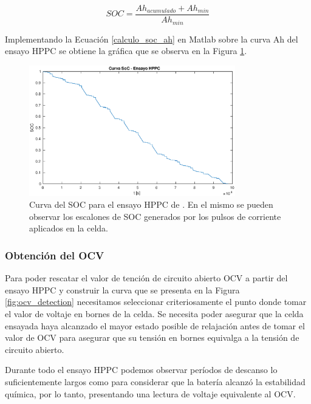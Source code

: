 \documentclass[10pt, a4paper]{report}
\begin{document}
\begin{equation}
    SOC = \frac{Ah_{acumulado} + Ah_{min}}{Ah_{min}} \label{calculo_soc_ah}
\end{equation}

Implementando la Ecuaci\'on \ref{calculo_soc_ah} en Matlab sobre la curva Ah del
ensayo \acrshort{HPPC} se obtiene la gr\'afica que se observa en la Figura
\ref{soc_hppc_data}.

\begin{figure}[h!]
    \begin{center}
        \includegraphics[width=0.8\textwidth]{soc_hppc_data.eps}
        \caption{Curva del \acrshort{SOC} para el ensayo HPPC de
        \cite{Kollmeyer2018}. En el mismo se pueden observar los escalones de
        \acrshort{SOC} generados por los pulsos de corriente aplicados en la
        celda.}
        \label{soc_hppc_data}
    \end{center}
\end{figure}
\FloatBarrier

\subsubsection{Obtenci\'on del \acrshort{OCV}}

Para poder rescatar el valor de tención de circuito abierto \acrshort{OCV} a
partir del ensayo \acrshort{HPPC} y construir la curva que se presenta en la
Figura \ref{fig:ocv_detection}  necesitamos seleccionar criteriosamente el punto
donde tomar el valor de voltaje en bornes de la celda. Se necesita poder
asegurar que la celda ensayada haya alcanzado el mayor estado posible de
relajación antes de tomar el valor de \acrshort{OCV} para asegurar que su
tensión en bornes equivalga a la tensión de circuito abierto.

Durante todo el ensayo \acrshort{HPPC} podemos observar per\'iodos de descanso
lo suficientemente largos como para considerar que la bater\'ia alcanz\'o la
estabilidad qu\'imica, por lo tanto, presentando una lectura de voltaje
equivalente al \acrshort{OCV}.
\end{document}
